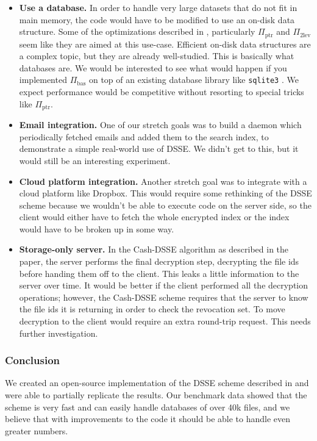 \begin{itemize}
\item \textbf{Use a database.} In order to handle very large datasets that do not fit in main memory, the code would have to be modified to use an on-disk data structure. Some of the optimizations described in \cite{cash14}, particularly $\Pi_{\mathrm{ptr}}$ and $\Pi_{\mathrm{2lev}}$ seem like they are aimed at this use-case. Efficient on-disk data structures are a complex topic, but they are already well-studied. This is basically what databases are. We would be interested to see what would happen if you implemented $\Pi_{\mathrm{bas}}$ on top of an existing database library like \texttt{sqlite3} \cite{sqlite3}. We expect performance would be competitive without resorting to special tricks like $\Pi_{\mathrm{ptr}}$.

\item \textbf{Email integration.} One of our stretch goals was to build a daemon which periodically fetched emails and added them to the search index, to demonstrate a simple real-world use of DSSE. We didn't get to this, but it would still be an interesting experiment.

\item \textbf{Cloud platform integration.} Another stretch goal was to integrate with a cloud platform like Dropbox. This would require some rethinking of the DSSE scheme because we wouldn't be able to execute code on the server side, so the client would either have to fetch the whole encrypted index or the index would have to be broken up in some way.

\item \textbf{Storage-only server.} In the Cash-DSSE algorithm as described in the paper, the server performs the final decryption step, decrypting the file ids before handing them off to the client. This leaks a little information to the server over time. It would be better if the client performed all the decryption operations;  however, the Cash-DSSE scheme requires that the server to know the file ids it is returning in order to check the revocation set. To move decryption to the client would require an extra round-trip request. This needs further investigation.


\end{itemize}

\subsubsection{Conclusion}

We created an open-source implementation of the DSSE scheme described in \cite{cash14}
and were able to partially replicate the results.
Our benchmark data showed that the scheme is very fast and can easily handle databases of over 40k files, and we believe that with improvements to the code it should be able to handle even greater numbers.
